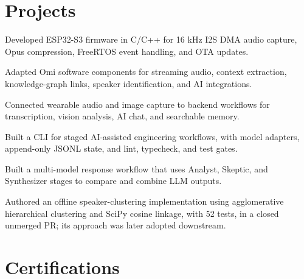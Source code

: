 \documentclass{../../templates/1/resume}
\begin{document}
\section{Projects}
\begin{resumeitemize}
\item Developed ESP32-S3 firmware in C/C++ for 16 kHz I2S DMA audio capture, Opus compression, FreeRTOS event handling, and OTA updates.
\item Adapted Omi software components for streaming audio, context extraction, knowledge-graph links, speaker identification, and AI integrations.
\item Connected wearable audio and image capture to backend workflows for transcription, vision analysis, AI chat, and searchable memory.
\end{resumeitemize}
\begin{resumeitemize}
\item Built a CLI for staged AI-assisted engineering workflows, with model adapters, append-only JSONL state, and lint, typecheck, and test gates.
\end{resumeitemize}
\begin{resumeitemize}
\item Built a multi-model response workflow that uses Analyst, Skeptic, and Synthesizer stages to compare and combine LLM outputs.
\end{resumeitemize}
\begin{resumeitemize}
\item Authored an offline speaker-clustering implementation using agglomerative hierarchical clustering and SciPy cosine linkage, with 52 tests, in a closed unmerged PR; its approach was later adopted downstream.
\end{resumeitemize}
\section{Certifications}
\end{document}
